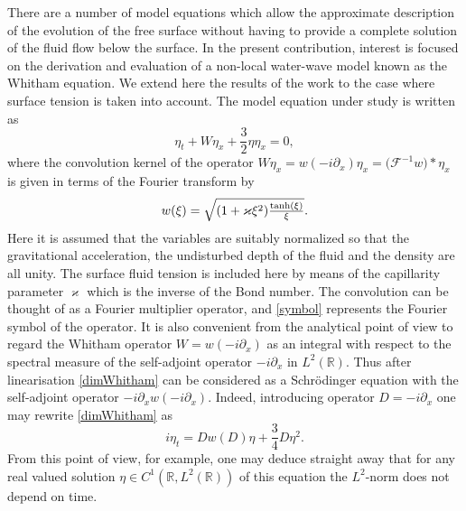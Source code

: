 There are a number of model equations which
allow the approximate description of the evolution of the free surface
without having to provide a complete solution of the fluid flow
below the surface.
%
In the present contribution, interest is focused on the derivation and evaluation of
a non-local water-wave model known as the Whitham equation.
We extend here the results of the work \cite{Moldabayev2015}
to the case where surface tension is taken into account.
The model equation under study is written as
%
\begin{equation}
\label{dimWhitham}
	\eta_t + W \eta_x + \frac 32 \eta \eta_x = 0
	,
\end{equation}
%
where the convolution kernel of the operator
\(
	W \eta_x = w(-i \partial _x) \eta_x
	= \big( {\mathcal F}^{-1} w \big) * \eta_x
\)	
is given in terms of the Fourier transform by
%
\begin{equation}
\label{symbol}
	w(\xi) = \sqrt{ ( 1 + \varkappa \xi^2 ) {\textstyle{\frac{ \tanh(\xi) }{ \xi }}}}.
\end{equation}
%
Here it is assumed that the variables are suitably normalized so that
the gravitational acceleration, the undisturbed depth of the fluid
and the density are all unity.
The surface fluid tension is included here by means of the
capillarity parameter $\varkappa$ which is the inverse of the Bond number.
The convolution can be thought of as a Fourier multiplier operator,
and \eqref{symbol} represents the Fourier symbol of the operator. 
It is also convenient from the analytical point of view to
regard the Whitham operator $W = w(-i \partial _x)$
as an integral with respect to the spectral measure
of the self-adjoint operator $-i \partial _x$ in $L^2( \mathbb R )$.
Thus after linearisation \eqref{dimWhitham} can be considered
as a Schr\"odinger equation with the self-adjoint operator
$-i \partial _x w(-i \partial _x)$.
Indeed, introducing operator $D = -i \partial _x$ one may
rewrite \eqref{dimWhitham} as
%
\[
	i \eta_t = D w(D) \eta + \frac 34 D \eta^2
	.
\]
%
From this point of view, for example, one may deduce straight away that for any
real valued solution $\eta \in C^1( \mathbb R, L^2( \mathbb R ) )$
of this equation the $L^2$-norm does not depend on time.


